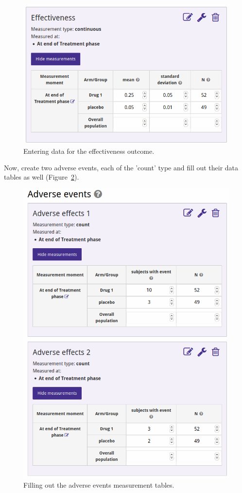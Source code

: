 \documentclass[12pt]{article}
\begin{document}
\begin{figure}[!htbp]
  \centering
  \includegraphics[width=\textwidth]{img/measurements.png}
  \caption{Entering data for the effectiveness outcome.}
\label{fig:measurements}
\end{figure}

Now, create two adverse events, each of the 'count' type and fill out their data tables as well (Figure~\ref{fig:aeData}).

\begin{figure}[!htbp]
  \centering
  \includegraphics[width=\textwidth]{img/aeData.png}
  \caption{Filling out the adverse events measurement tables.}
\label{fig:aeData}
\end{figure}
\end{document}
